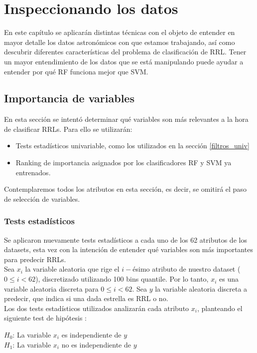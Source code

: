 \chapter{Inspeccionando los datos}
\label{inspeccionando}
En este capítulo se aplicarán distintas técnicas con el objeto de entender en mayor detalle los datos astronómicos con que estamos trabajando, así como descubrir diferentes características del problema de clasificación de RRL. Tener un mayor entendimiento de los datos que se está manipulando puede ayudar a entender por qué RF funciona mejor que SVM.

\section{Importancia de variables}

En esta sección se intentó determinar qué variables son más relevantes a la hora de clasificar RRLs. Para ello se utilizarán:
\begin{itemize}
\item Tests estadísticos univariable, como los utilizados en la sección \ref{filtros_univ}
\item Ranking de importancia asignados por los clasificadores RF y SVM ya entrenados.
\end{itemize} 

Contemplaremos todos los atributos en esta sección, es decir, se omitirá el paso de selección de variables.

\subsection{Tests estadísticos}
Se aplicaron nuevamente tests estadísticos a cada uno de los 62 atributos de los datasets, esta vez con la intención de entender qué variables son más importantes para predecir RRLs.\\

Sea $x_i$ la variable aleatoria que rige el $i-$ésimo atributo de nuestro dataset ($0 \leq i < 62$), discretizado utilizando 100 bins quantile. Por lo tanto, $x_i$ es una variable aleatoria discreta para $0 \leq i < 62$. Sea $y$ la variable aleatoria discreta a predecir, que indica si una dada estrella es RRL o no. \\

Los dos tests estadísticos utilizados analizarán cada atributo $x_i$, planteando el siguiente test de hipótesis \cite{meyer1970introductory}: \\
\begin{adjustwidth}{2cm}{}
\textbf{$H_0$}: La variable $x_i$ es independiente de $y$ \\
\textbf{$H_1$}: La variable $x_i$ no es independiente de $y$ \\
\end{adjustwidth}

